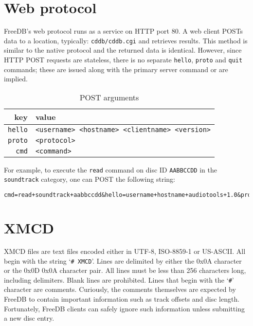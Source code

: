\pagebreak

\section{Web protocol}
FreeDB's web protocol runs as a service on HTTP port 80.
A web client POSTs data to a location, typically: \texttt{cddb/cddb.cgi}
and retrieves results.
This method is similar to the native protocol and the returned
data is identical.
However, since HTTP POST requests are stateless,
there is no separate \texttt{hello}, \texttt{proto} and \texttt{quit} commands;
these are issued along with the primary server command or are implied.
\begin{table}[h]
\begin{tabular}{|r|l|}
\hline
key & value \\
\hline
\texttt{hello} &
\texttt{<username> <hostname> <clientname> <version>} \\
\texttt{proto} &
\texttt{<protocol>} \\
\texttt{cmd} &
\texttt{<command>} \\
\hline
\end{tabular}
\caption{POST arguments}
\end{table}
\par
\noindent
For example, to execute the \texttt{read} command on disc ID \texttt{AABBCCDD}
in the \texttt{soundtrack} category, one can POST the following string:
\begin{Verbatim}[frame=single]
cmd=read+soundtrack+aabbccdd&hello=username+hostname+audiotools+1.0&proto=6
\end{Verbatim}

\section{XMCD}

XMCD files are text files encoded either in UTF-8, ISO-8859-1 or
US-ASCII.
All begin with the string `\texttt{\# XMCD}'.
Lines are delimited by either the 0x0A character
or the 0x0D 0x0A character pair.
All lines must be less than 256 characters long,
including delimiters.
Blank lines are prohibited.
Lines that begin with the `\texttt{\#}' character are comments.
Curiously, the comments themselves are expected by FreeDB to contain
important information such as track offsets and disc length.
Fortunately, FreeDB clients can safely ignore such information
unless submitting a new disc entry.

